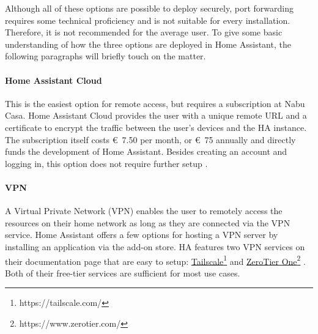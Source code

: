 Although all of these options are possible to deploy securely, port forwarding requires some technical proficiency and is not suitable for every installation. Therefore, it is not recommended for the average user. To give some basic understanding of how the three options are deployed in Home Assistant, the following paragraphs will briefly touch on the matter.

\paragraph{Home Assistant Cloud}
This is the easiest option for remote access, but requires a subscription at Nabu Casa. Home Assistant Cloud provides the user with a unique remote URL and a certificate to encrypt the traffic between the user's devices and the HA instance. The subscription itself costs €~7.50 per month, or €~75 annually \cite{NabuCasa_Pricing} and directly funds the development of Home Assistant. Besides creating an account and logging in, this option does not require further setup \cite{HomeAssistant_Remote_Access}.

\paragraph{VPN}
A Virtual Private Network (VPN) enables the user to remotely access the resources on their home network as long as they are connected via the VPN service. Home Assistant offers a few options for hosting a VPN server by installing an application via the add-on store. HA features two VPN services on their documentation page that are easy to setup: \href{https://tailscale.com/}{Tailscale}\footnote{https://tailscale.com/} and \href{https://www.zerotier.com/}{ZeroTier One}\footnote{https://www.zerotier.com/} \cite{HomeAssistant_Remote_Access}. Both of their free-tier services are sufficient for most use cases.

